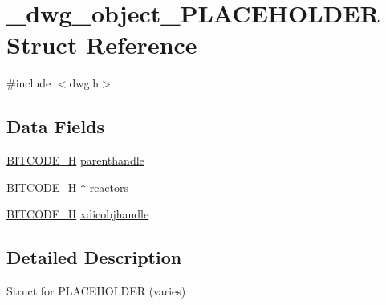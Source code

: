 \hypertarget{struct__dwg__object__PLACEHOLDER}{\section{\-\_\-dwg\-\_\-object\-\_\-\-P\-L\-A\-C\-E\-H\-O\-L\-D\-E\-R \-Struct \-Reference}
\label{struct__dwg__object__PLACEHOLDER}
}


{\ttfamily \#include $<$dwg.\-h$>$}

\subsection*{\-Data \-Fields}
\begin{DoxyCompactItemize}
\item 
\hyperlink{dwg_8h_a7c700e94e047a97ba8c24bdfe4029dc3}{\-B\-I\-T\-C\-O\-D\-E\-\_\-\-H} \hyperlink{struct__dwg__object__PLACEHOLDER_a548caa95c607fc7270026ab6f1feb398}{parenthandle}
\item 
\hyperlink{dwg_8h_a7c700e94e047a97ba8c24bdfe4029dc3}{\-B\-I\-T\-C\-O\-D\-E\-\_\-\-H} $\ast$ \hyperlink{struct__dwg__object__PLACEHOLDER_a90de9efebf9751fe8f1a8b80cdbb6258}{reactors}
\item 
\hyperlink{dwg_8h_a7c700e94e047a97ba8c24bdfe4029dc3}{\-B\-I\-T\-C\-O\-D\-E\-\_\-\-H} \hyperlink{struct__dwg__object__PLACEHOLDER_a9c4d819e8f15b25fecb90937587981f9}{xdicobjhandle}
\end{DoxyCompactItemize}


\subsection{\-Detailed \-Description}
\-Struct for \-P\-L\-A\-C\-E\-H\-O\-L\-D\-E\-R (varies) 


